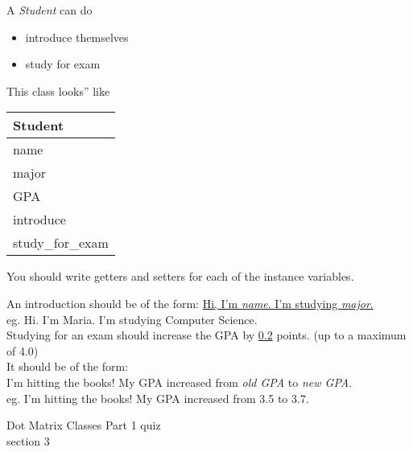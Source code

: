 \documentclass{article}
\newcommand{\tab}{\hspace*{0.25in}}
\newcommand{\csq}[1]{\reflectbox{''}#1''}  %
\begin{document}
\begin{enumerate}
\begin{minipage}{.6\textwidth}
		A \textit{Student} can do
		\begin{itemize}
			\item introduce themselves
			\item study for exam
		\end{itemize}
	\end{minipage} 
	\begin{minipage}{.4\textwidth}
		This class \csq{looks} like
		 
		\vspace*{1em}
		\begin{tabular}{|l|}
			\hline Student\\ \hline
			name\\ major\\ GPA\\ \hline
			introduce\\ study\_for\_exam \\  \hline
		\end{tabular}
	\end{minipage}

	\vspace*{2ex}
	You should write getters and setters for each of the instance variables.\

	An introduction should be of the form: \underline{Hi, I'm  \textit{name}.  
	I'm studying \textit{major}.}\\
	\tab \tab eg. Hi. I'm Maria. I'm studying Computer Science.\\

	Studying for an exam should increase the GPA by \underline{0.2} points. (up to a maximum of 4.0)\\  
	It should be of the form: \\
	I'm hitting the books! My GPA increased from \textit{old GPA} to \textit{new GPA}.\\
	\tab \tab eg. I'm hitting the books! My GPA increased from 3.5 to 3.7.\\


\end{enumerate}
\pagebreak
Dot Matrix \hfill Classes Part 1 quiz\\
section 3\\
\end{document}

